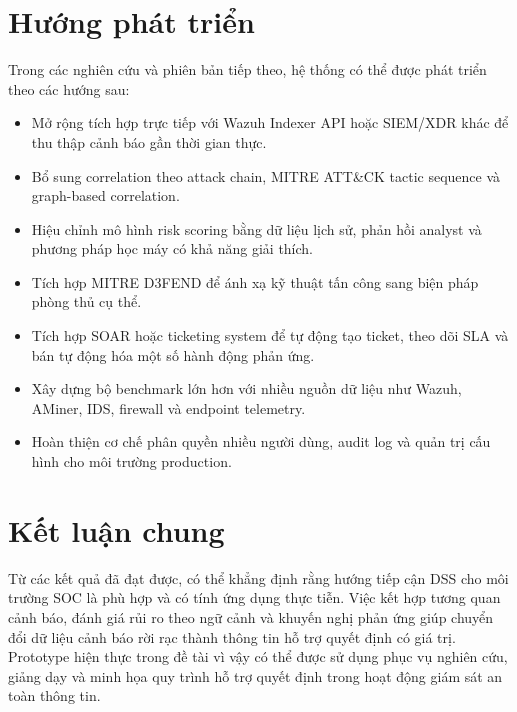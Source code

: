\documentclass[a4paper,12pt,oneside]{book}
\begin{document}
\section{Hướng phát triển}
{\fontsize{13pt}{15.6pt}\selectfont

Trong các nghiên cứu và phiên bản tiếp theo, hệ thống có thể được phát triển theo các hướng sau:

\begin{itemize}
    \item Mở rộng tích hợp trực tiếp với Wazuh Indexer API hoặc SIEM/XDR khác để thu thập cảnh báo gần thời gian thực.
    \item Bổ sung correlation theo attack chain, MITRE ATT\&CK tactic sequence và graph-based correlation.
    \item Hiệu chỉnh mô hình risk scoring bằng dữ liệu lịch sử, phản hồi analyst và phương pháp học máy có khả năng giải thích.
    \item Tích hợp MITRE D3FEND để ánh xạ kỹ thuật tấn công sang biện pháp phòng thủ cụ thể.
    \item Tích hợp SOAR hoặc ticketing system để tự động tạo ticket, theo dõi SLA và bán tự động hóa một số hành động phản ứng.
    \item Xây dựng bộ benchmark lớn hơn với nhiều nguồn dữ liệu như Wazuh, AMiner, IDS, firewall và endpoint telemetry.
    \item Hoàn thiện cơ chế phân quyền nhiều người dùng, audit log và quản trị cấu hình cho môi trường production.
\end{itemize}

}

\section{Kết luận chung}
{\fontsize{13pt}{15.6pt}\selectfont

Từ các kết quả đã đạt được, có thể khẳng định rằng hướng tiếp cận DSS cho môi trường SOC là phù hợp và có tính ứng dụng thực tiễn. Việc kết hợp tương quan cảnh báo, đánh giá rủi ro theo ngữ cảnh và khuyến nghị phản ứng giúp chuyển đổi dữ liệu cảnh báo rời rạc thành thông tin hỗ trợ quyết định có giá trị. Prototype hiện thực trong đề tài vì vậy có thể được sử dụng phục vụ nghiên cứu, giảng dạy và minh họa quy trình hỗ trợ quyết định trong hoạt động giám sát an toàn thông tin.

}

\clearpage
\thispagestyle{empty}
{}

\vspace{0.6cm}

\nocite{*}


\end{document}
